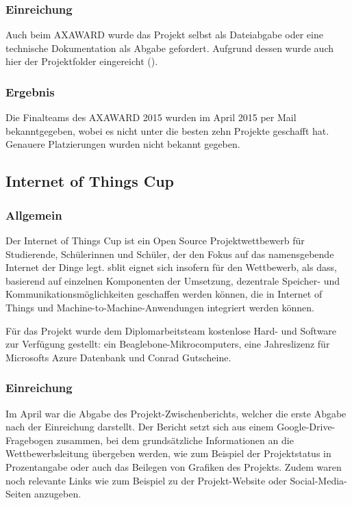 \subsubsection{Einreichung}
Auch beim AXAWARD wurde das Projekt selbst als Dateiabgabe oder eine technische
Dokumentation als Abgabe gefordert. Aufgrund dessen wurde auch hier der Projektfolder eingereicht ().

\subsubsection{Ergebnis}
Die Finalteams des AXAWARD 2015 wurden im April 2015 per Mail bekanntgegeben, wobei es \sblit nicht
unter die besten zehn Projekte geschafft hat. Genauere Platzierungen wurden nicht bekannt gegeben.


\subsection{Internet of Things Cup}
\subsubsection{Allgemein}
Der Internet of Things Cup ist ein Open Source Projektwettbewerb für Studierende, Schülerinnen und Schüler,
der den Fokus auf das namensgebende Internet der Dinge legt. sblit eignet sich insofern für den Wettbewerb,
als dass, basierend auf einzelnen Komponenten der Umsetzung, dezentrale Speicher- und Kommunikationsmöglichkeiten
geschaffen werden können, die in Internet of Things und Machine-to-Machine-Anwendungen integriert werden können.

Für das Projekt wurde dem Diplomarbeitsteam kostenlose Hard- und Software zur Verfügung gestellt: ein
Beaglebone-Mikrocomputers, eine Jahreslizenz für Microsofts Azure Datenbank und Conrad Gutscheine.

\subsubsection{Einreichung}
Im April war die Abgabe des Projekt-Zwischenberichts, welcher die erste Abgabe nach
der Einreichung darstellt. Der Bericht setzt sich aus einem Google-Drive-Fragebogen
zusammen, bei dem grundsätzliche Informationen an die Wettbewerbsleitung übergeben
werden, wie zum Beispiel der Projektstatus in Prozentangabe oder auch das Beilegen
von Grafiken des Projekts. Zudem waren noch relevante Links wie zum Beispiel zu der
Projekt-Website oder Social-Media-Seiten anzugeben.

